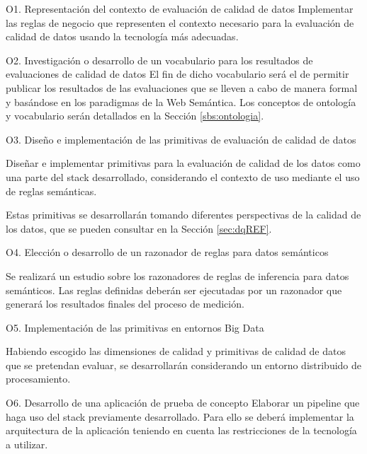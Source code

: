 \begin{definitionlist}
\item[O1. Representación del contexto de evaluación de calidad de datos]
Implementar  las  reglas  de  negocio  que representen el contexto necesario
para la evaluación de
calidad  de datos usando la tecnología más adecuadas.
\label{sec:reglas}

\item[O2. Investigación o desarrollo de un vocabulario para los resultados
  de evaluaciones de calidad de datos]
El fin de dicho vocabulario será el de permitir publicar los
resultados de las evaluaciones que se lleven a cabo de manera formal y basándose
en los paradigmas de la Web Semántica. Los conceptos de ontología y vocabulario
serán detallados en la Sección \ref{sbs:ontologia}. 

\item[O3. Diseño e implementación de las primitivas de evaluación de calidad de datos]

Diseñar e implementar primitivas para la evaluación de calidad de los datos como
una parte del stack desarrollado, considerando el contexto de uso mediante el uso
de reglas semánticas.

Estas primitivas se desarrollarán tomando diferentes perspectivas de la calidad
de los datos, que se pueden consultar en la Sección \ref{sec:dqREF}. 


\item[O4. Elección o desarrollo de un razonador de reglas para datos semánticos]

Se realizará un estudio sobre los razonadores de reglas de inferencia para
datos semánticos. Las reglas definidas deberán ser
ejecutadas por un razonador que generará los resultados finales del proceso de
medición. 

\item[O5. Implementación de las primitivas en entornos Big Data]

Habiendo escogido las dimensiones de calidad y primitivas de calidad de datos
que se pretendan evaluar, se desarrollarán considerando un entorno distribuido
de procesamiento. 

\item[O6. Desarrollo de una aplicación de prueba de concepto]
Elaborar un pipeline que haga uso del stack 
previamente desarrollado. Para ello se deberá implementar la arquitectura de
la aplicación teniendo en cuenta las restricciones de la tecnología a utilizar.

\end{definitionlist}
